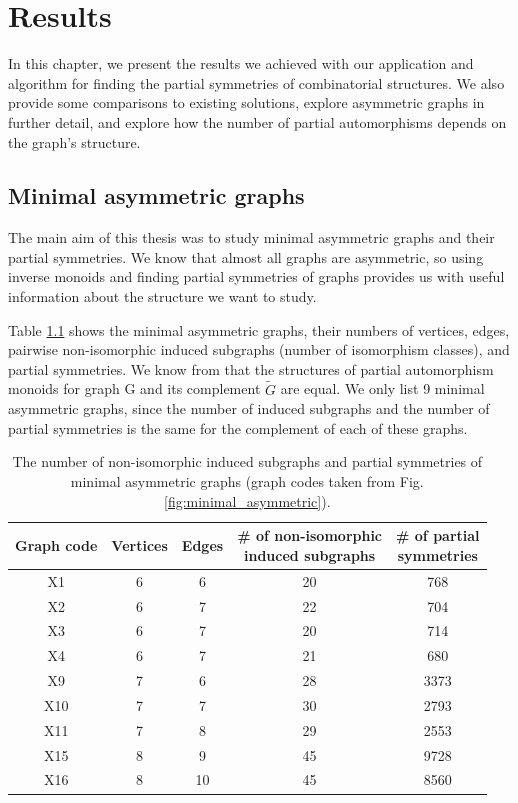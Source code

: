 \chapter{Results}\label{chap:results}

In this chapter, we present the results we achieved with our application and algorithm for finding the partial symmetries of combinatorial structures. We also provide some comparisons to existing solutions, explore asymmetric graphs in further detail, and explore how the number of partial automorphisms depends on the graph's structure.

\section{Minimal asymmetric graphs}
The main aim of this thesis was to study minimal asymmetric graphs and their partial symmetries. We know that almost all graphs are asymmetric, so using inverse monoids and finding partial symmetries of graphs provides us with useful information about the structure we want to study.

Table \ref{table:asymmetric_graphs} shows the minimal asymmetric graphs, their numbers of vertices, edges, pairwise non-isomorphic induced subgraphs (number of isomorphism classes), and partial symmetries. We know from \cite{jjss21} that the structures of partial automorphism monoids for graph G and its complement $\tilde{G}$ are equal. We only list 9 minimal asymmetric graphs, since the number of induced subgraphs and the number of partial symmetries is the same for the complement of each of these graphs.

\begin{table}
\begin{tabular}{ | c | c | c | c | c | }
\hline
Graph code & Vertices & Edges & \thead{\# of non-isomorphic \\induced subgraphs} & \thead{\# of partial \\symmetries} \\
\hline
X1 & 6 & 6 & 20 & 768 \\
X2 & 6 & 7 & 22 & 704 \\
X3 & 6 & 7 & 20 & 714 \\
X4 & 6 & 7 & 21 & 680 \\
X9 & 7 & 6 & 28 & 3373 \\
X10 & 7 & 7 & 30 & 2793 \\
X11 & 7 & 8 & 29 & 2553 \\
X15 & 8 & 9 & 45 & 9728 \\
X16 & 8 & 10 & 45 & 8560 \\
\hline
\end{tabular}
\caption{\label{table:asymmetric_graphs} The number of non-isomorphic induced subgraphs and partial symmetries of minimal asymmetric graphs (graph codes taken from Fig. \ref{fig:minimal_asymmetric}).}
\end{table}

